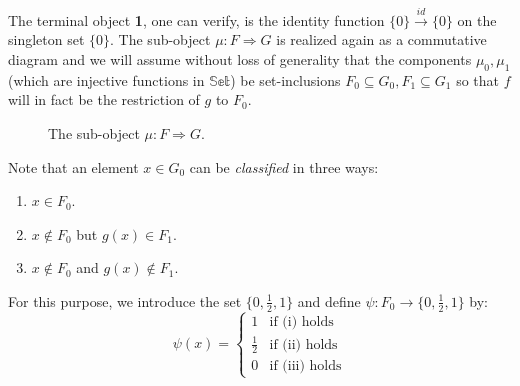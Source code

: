 \begin{ex}
		The terminal object \textbf{1}, one can verify, is the identity function $\{0\} \xrightarrow{id} \{0\}$ on the singleton set $\{0\}$. \newline
		The sub-object $\mu : F \Rightarrow G$ is realized again as a commutative diagram and we will assume without loss of generality  that the components $\mu_0, \mu_1$ (which are injective functions in $\mathbb{Set}$) be set-inclusions $F_0 \subseteq G_0, F_1 \subseteq G_1$  so that $f$ will in fact be the restriction of $g$ to $F_0$. 
		\begin{figure}[h]
			\centering
			\caption{The sub-object $\mu : F \Rightarrow G$.}
		\end{figure}
		\newline
		Note that an element $x \in G_0$ can be \emph{classified} in three ways:
		\begin{enumerate}[label=(\roman*)]
			\item $x \in F_0$.
			\item $x \notin F_0$ but $g(x) \in F_1$.
			\item $x \notin F_0$ and $g(x) \notin F_1$.
		\end{enumerate}
		 For this purpose, we introduce the set $\{0,\frac{1}{2},1\}$ and define $\psi : F_0 \rightarrow \{0,\frac{1}{2},1\}$ by:
		 \begin{equation*}
		 	\psi(x) =
		 	\begin{cases}
		 		1 & \text{if (i) holds}\\
		 		\frac{1}{2} & \text{if (ii) holds}\\
		 		0 & \text{if (iii) holds}
		 	\end{cases}       
		 \end{equation*}  
		  
		  \begin{figure}[h]
		  	\centering
		  	
\end{figure}
\end{ex}
